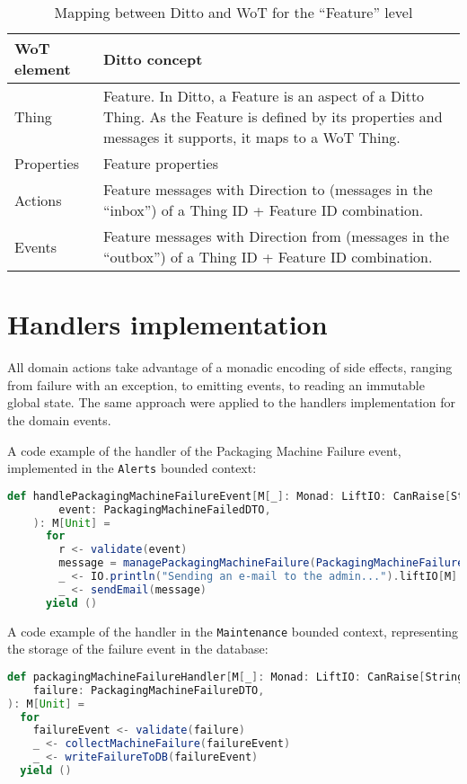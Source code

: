 \begin{table}[H]
    \begin{tabular}{|p{}|p{}|}
    \hline
    \textbf{WoT element} & \textbf{Ditto concept} \\ \hline
    Thing & Feature. In Ditto, a Feature is an aspect of a Ditto Thing. As the Feature is defined by its properties and messages it supports, it maps to a WoT Thing. \\ \hline
    Properties & Feature properties \\ \hline
    Actions &	Feature messages with Direction to (messages in the “inbox”) of a Thing ID + Feature ID combination. \\ \hline
    Events &	Feature messages with Direction from (messages in the “outbox”) of a Thing ID + Feature ID combination. \\ \hline
    \end{tabular}
    \caption{Mapping between Ditto and WoT for the ``Feature'' level}
    \label{tab:ditto-wot-feature}
\end{table}

\section{Handlers implementation}
All domain actions take advantage of a monadic encoding of side effects, ranging from failure with an exception, to emitting events, to reading an immutable global state.
The same approach were applied to the handlers implementation for the domain events.


A code example of the handler of the Packaging Machine Failure event, implemented in the \texttt{Alerts} bounded context:

\begin{lstlisting}[language=Scala]
    def handlePackagingMachineFailureEvent[M[_]: Monad: LiftIO: CanRaise[String]](
        event: PackagingMachineFailedDTO,
    ): M[Unit] =
      for
        r <- validate(event)
        message = managePackagingMachineFailure(PackagingMachineFailure(LocalTime.now(), r.batchID, r.cutterTemperature))
        _ <- IO.println("Sending an e-mail to the admin...").liftIO[M]
        _ <- sendEmail(message)
      yield ()
\end{lstlisting}


A code example of the handler in the \texttt{Maintenance} bounded context, representing the storage of the failure event in the database:

\begin{lstlisting}[language=Scala]
def packagingMachineFailureHandler[M[_]: Monad: LiftIO: CanRaise[String]](
    failure: PackagingMachineFailureDTO,
): M[Unit] =
  for
    failureEvent <- validate(failure)
    _ <- collectMachineFailure(failureEvent)
    _ <- writeFailureToDB(failureEvent)
  yield ()
\end{lstlisting}

